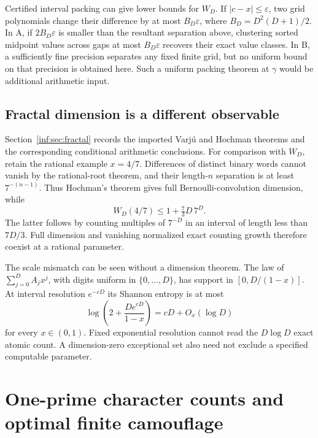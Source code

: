 \documentclass[11pt,a4paper]{article}
\theoremstyle{definition}
\theoremstyle{remark}
\numberwithin{equation}{section}
\begin{document}
Certified interval packing can give lower bounds for \(W_D\). If
\(|c-x|\le\varepsilon\), two grid polynomials change their difference
by at most \(B_D\varepsilon\), where \(B_D=D^2(D+1)/2\). In A, if
\(2B_D\varepsilon\) is smaller than the resultant separation above,
clustering sorted midpoint values across gaps at most
\(B_D\varepsilon\) recovers their exact value classes. In B, a sufficiently
fine precision separates any fixed finite grid, but no uniform bound on
that precision is obtained here. Such a uniform packing theorem at
\(\gamma\) would be additional arithmetic input.

\subsection{Fractal dimension is a different observable}

Section~\ref{inf:sec:fractal} records the imported Varj\'u and Hochman
theorems and the corresponding conditional arithmetic conclusions.
For comparison with \(W_D\), retain the rational example \(x=4/7\).
Differences of distinct binary words cannot vanish by the rational-root
theorem, and their length-\(n\) separation is at least \(7^{-(n-1)}\).
Thus Hochman's theorem \cite{inf:Hochman} gives full Bernoulli-convolution dimension,
while
\[
 W_D(4/7)\le1+\tfrac73D\,7^D.
\]
The latter follows by counting multiples of \(7^{-D}\) in an interval
of length less than \(7D/3\). Full dimension and vanishing normalized
exact counting growth therefore coexist at a rational parameter.

The scale mismatch can be seen without a dimension theorem. The law of
\(\sum_{j=0}^D A_jx^j\), with digits uniform in \(\{0,\ldots,D\}\), has
support in \([0,D/(1-x)]\). At interval resolution \(e^{-cD}\) its
Shannon entropy is at most
\[
 \log\left(2+\frac{De^{cD}}{1-x}\right)=cD+O_x(\log D)
\]
for every \(x\in(0,1)\). Fixed exponential resolution cannot read the
\(D\log D\) exact atomic count. A dimension-zero exceptional set also
need not exclude a specified computable parameter.

\section{One-prime character counts and optimal finite camouflage}
\label{wr:sec-local}
\end{document}
